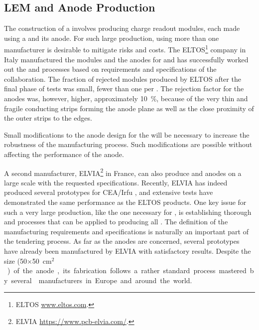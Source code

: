 \subsection{LEM and Anode Production}
\label{sec:dp-crp-LASprod}


The construction of a  
 involves producing \dpnumswch charge readout modules, each made using a  and its anode. For such large production, using more than one manufacturer is desirable to mitigate risks and costs. The ELTOS\footnote{ELTOS\texttrademark{} \url{www.eltos.com}.} company in Italy manufactured the  modules and the anodes for   and has successfully worked out the  and  processes based on requirements and specifications of the  collaboration. The fraction of rejected  modules produced by ELTOS after the final phase of tests was small, fewer than one  per . The rejection factor for the anodes was, however, higher, approximately \SI{10}{\%}, because of the very thin and fragile conducting strips forming the anode plane as well as the close proximity of the outer strips to the  edges. 

Small modifications to the anode design for the  will be necessary to increase the robustness of the manufacturing process. Such modifications are possible without  %
affecting the performance of the anode.   

A second manufacturer, ELVIA\footnote{ELVIA\texttrademark{} \url{https://www.pcb-elvia.com/}.} in France, can also produce  and anodes on a large scale with the requested specifications. Recently, ELVIA has indeed produced several  prototypes for CEA/Irfu 
, and extensive tests have %
demonstrated the same  performance as the ELTOS products.
 One key issue for such a very large production, like the one necessary for , is establishing thorough  and  processes that can be applied to producing all . The definition of the  manufacturing requirements and specifications is naturally an important part of the tendering process. As far as the anodes are concerned, several prototypes have already been manufactured by ELVIA with satisfactory results. Despite the size (\num{50}$\times$\SI{50}{cm$^2$}) of the anode, its fabrication follows a rather standard process mastered by several  manufacturers in Europe and around the world.     

